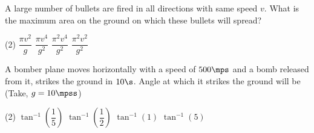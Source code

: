 \item A large number of bullets are fired in all directions with same speed $v$. What is the maximum area on the ground on which these bullets will spread?
\begin{tasks}(2)
    \task $\dfrac{\pi v^2}{g}$
    \task $\dfrac{\pi v^4}{g^2}$\ans
    \task $\dfrac{\pi^2v^4}{g^2}$
    \task $\dfrac{\pi^2v^2}{g^2}$
\end{tasks}

\item A bomber plane moves horizontally with a speed of $500\mps$ and a bomb released from it, strikes the ground in $10\s$. Angle at which it strikes the ground will be (Take, $g=10\mpss$)
\begin{tasks}(2)
    \task $\tan^{-1}\left(\dfrac{1}{5}\right)$\ans
    \task $\tan^{-1}\left(\dfrac{1}{2}\right)$
    \task $\tan^{-1}\left(1\right)$
    \task $\tan^{-1}\left(5\right)$
\end{tasks}
